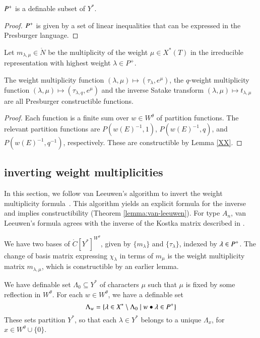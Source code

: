 \begin{lemma}
$P^+$ is a definable subset of $Y^*$.
\end{lemma}

\begin{proof}
$P^+$ is given by a set of linear inequalities that can be expressed in the Presburger language.
\end{proof}


Let $m_{\lambda,\mu}\in \ring{N}$ be the multiplicity of the weight $\mu\in X^*(T)$
in the irreducible representation with highest weight $\lambda\in P^+$.


\begin{lemma}  The weight multiplicity function $(\lambda,\mu)\mapsto (\tau_\lambda,e^\mu)$, the $q$-weight multiplicity
function $(\lambda,\mu)\mapsto (\tau_{\lambda,q},e^\mu)$  and the inverse Satake transform $(\lambda,\mu)\mapsto t_{\lambda,\mu}$
are all Presburger constructible functions.
\end{lemma}

\begin{proof} 
Each function is a finite sum over $w\in W^\theta$ of partition functions.  The relevant partition functions
are $P(w(E)^{-1},1)$, $P(w(E)^{-1},q)$, and $P(w(E)^{-1},q^{-1})$, respectively.  These are constructible
by Lemma \ref{XX}.
\end{proof}



\subsection{inverting weight multiplicities}

In this section, we follow  van Leeuwen's algorithm to invert the weight multiplicity
formula~\cite{vanleeuwen}.  This algorithm yields an explicit formula for the inverse and 
implies constructibility (Theorem \ref{lemma:van-leeuwen}).
For type $A_n$, van Leeuwen's formula agrees with the inverse of the Kostka
matrix described in \cite{duan}.

We have two bases of $\ring{C}[Y^*]^{W^\theta}$, given by $\{m_\lambda\}$ and $\{\tau_\lambda\}$, indexed
by $\lambda\in P^+$.  
The change of basis matrix expressing $\chi_\lambda$ in terms of $m_\mu$ is the weight multiplicity
matrix $m_{\lambda,\mu}$, which is constructible by an earlier lemma. 

We have definable set $\Lambda_0\subseteq Y^*$ of characters $\mu$ such that $\mu$ is fixed by some
reflection in $W^\theta$.  For each $w\in W^\theta$, we have a definable set 
\[
\Lambda_w = \{\lambda\in X^*\setminus \Lambda_0\mid w\bullet \lambda \in P^+\}
\]
These sets partition $Y^*$, so that each $\lambda\in Y^*$ belongs to a unique $\Lambda_x$, for $x\in W^\theta\cup\{0\}$.

